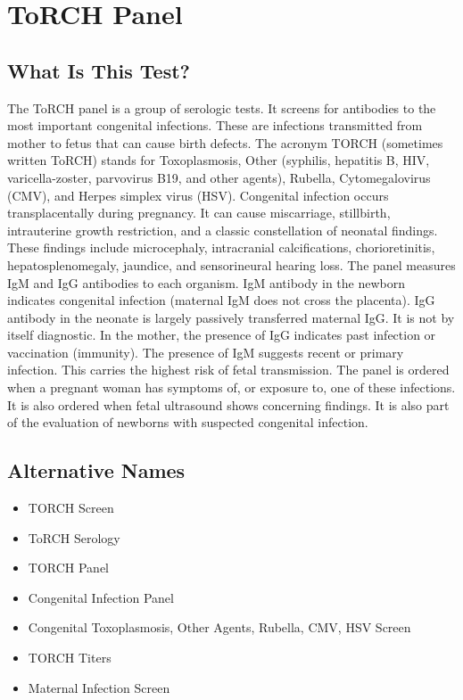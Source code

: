 \chapter{ToRCH Panel}

\section*{What Is This Test?}
The ToRCH panel is a group of serologic tests. It screens for antibodies to the most important congenital infections. These are infections transmitted from mother to fetus that can cause birth defects. The acronym TORCH (sometimes written ToRCH) stands for Toxoplasmosis, Other (syphilis, hepatitis B, HIV, varicella-zoster, parvovirus B19, and other agents), Rubella, Cytomegalovirus (CMV), and Herpes simplex virus (HSV). Congenital infection occurs transplacentally during pregnancy. It can cause miscarriage, stillbirth, intrauterine growth restriction, and a classic constellation of neonatal findings. These findings include microcephaly, intracranial calcifications, chorioretinitis, hepatosplenomegaly, jaundice, and sensorineural hearing loss. The panel measures IgM and IgG antibodies to each organism. IgM antibody in the newborn indicates congenital infection (maternal IgM does not cross the placenta). IgG antibody in the neonate is largely passively transferred maternal IgG. It is not by itself diagnostic. In the mother, the presence of IgG indicates past infection or vaccination (immunity). The presence of IgM suggests recent or primary infection. This carries the highest risk of fetal transmission. The panel is ordered when a pregnant woman has symptoms of, or exposure to, one of these infections. It is also ordered when fetal ultrasound shows concerning findings. It is also part of the evaluation of newborns with suspected congenital infection.

\section*{Alternative Names}
\begin{itemize}
  \item TORCH Screen
  \item ToRCH Serology
  \item TORCH Panel
  \item Congenital Infection Panel
  \item Congenital Toxoplasmosis, Other Agents, Rubella, CMV, HSV Screen
  \item TORCH Titers
  \item Maternal Infection Screen
\end{itemize}
